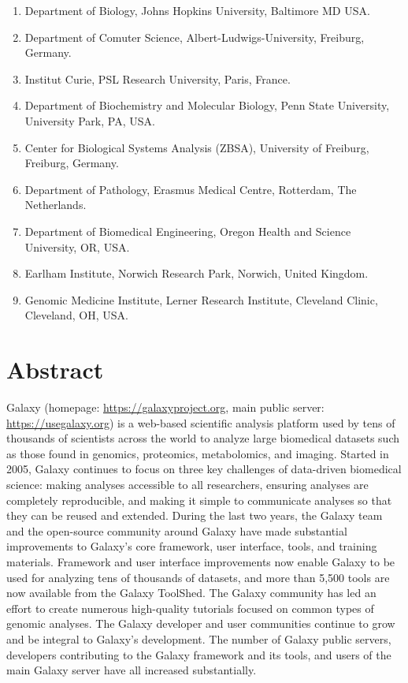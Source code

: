 \small
\begin{enumerate}
\itemsep-0.5em
\item Department of Biology, Johns Hopkins University, Baltimore MD USA.\label{galaxy-affil:hopkins}
\item Department of Comuter Science, Albert-Ludwigs-University, Freiburg, Germany.\label{galaxy-affil:freiburg}
\item Institut Curie, PSL Research University, Paris, France.\label{galaxy-affil:curie}
\item Department of Biochemistry and Molecular Biology, Penn State University, University Park, PA, USA.\label{galaxy-affil:pennstate}
\item Center for Biological Systems Analysis (ZBSA), University of Freiburg, Freiburg, Germany.\label{galaxy-affil:freiburg2}
\item Department of Pathology, Erasmus Medical Centre, Rotterdam, The Netherlands.\label{galaxy-affil:emc}
\item Department of Biomedical Engineering, Oregon Health and Science University, OR, USA.\label{galaxy-affil:oregon}
\item Earlham Institute, Norwich Research Park, Norwich, United Kingdom.\label{galaxy-affil:earlham}
\item Genomic Medicine Institute, Lerner Research Institute, Cleveland Clinic, Cleveland, OH, USA.\label{galaxy-affil:cleveland}
\end{enumerate}
\normalsize


\section*{Abstract}
Galaxy (homepage: \url{https://galaxyproject.org}, main public server: \url{https://usegalaxy.org}) is a web-based scientific analysis platform used by tens of thousands of scientists across the world to analyze large biomedical datasets such as those found in genomics, proteomics, metabolomics, and imaging. Started in 2005, Galaxy continues to focus on three key challenges of data-driven biomedical science: making analyses accessible to all researchers, ensuring analyses are completely reproducible, and making it simple to communicate analyses so that they can be reused and extended. During the last two years, the Galaxy team and the open-source community around Galaxy have made substantial improvements to Galaxy’s core framework, user interface, tools, and training materials. Framework and user interface improvements now enable Galaxy to be used for analyzing tens of thousands of datasets, and more than 5,500 tools are now available from the Galaxy ToolShed. The Galaxy community has led an effort to create numerous high-quality tutorials focused on common types of genomic analyses. The Galaxy developer and user communities continue to grow and be integral to Galaxy’s development. The number of Galaxy public servers, developers contributing to the Galaxy framework and its tools, and users of the main Galaxy server have all increased substantially.


